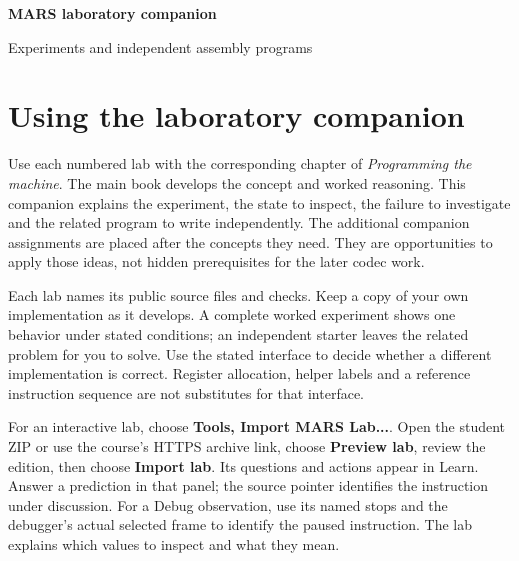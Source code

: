 \begin{titlepage}
  \centering
  \vspace*{30mm}
  {\Huge\bfseries MARS laboratory companion\par}
  \vspace{8mm}
  {\Large Experiments and independent assembly programs\par}
  \vspace{18mm}
  {\Large\MARSAuthor\par}
  \vfill
  {\MARSEdition\par}
\end{titlepage}

\chapter*{Using the laboratory companion}
\label{revision:using-lab-book}

Use each numbered lab with the corresponding chapter of \emph{Programming the
  machine}. The main book develops the concept and worked reasoning. This companion
explains the experiment, the state to inspect, the failure to investigate and the
related program to write independently. The additional companion assignments are
placed after the concepts they need. They are opportunities to apply those ideas,
not hidden prerequisites for the later codec work.

Each lab names its public source files and checks. Keep a copy of your own
implementation as it develops. A complete worked experiment shows one behavior
under stated conditions; an independent starter leaves the related problem for
you to solve. Use the stated interface to decide whether a different
implementation is correct. Register allocation, helper labels and a reference
instruction sequence are not substitutes for that interface.

For an interactive lab, choose \textbf{Tools, Import MARS Lab...}. Open the
student ZIP or use the course's HTTPS archive link, choose \textbf{Preview lab},
review the edition, then choose \textbf{Import lab}. Its questions and actions
appear in Learn. Answer a prediction in that panel; the source pointer identifies
the instruction under discussion. For a Debug observation, use its named stops
and the debugger's actual selected frame to identify the paused instruction.
The lab explains which values to inspect and what they mean.

